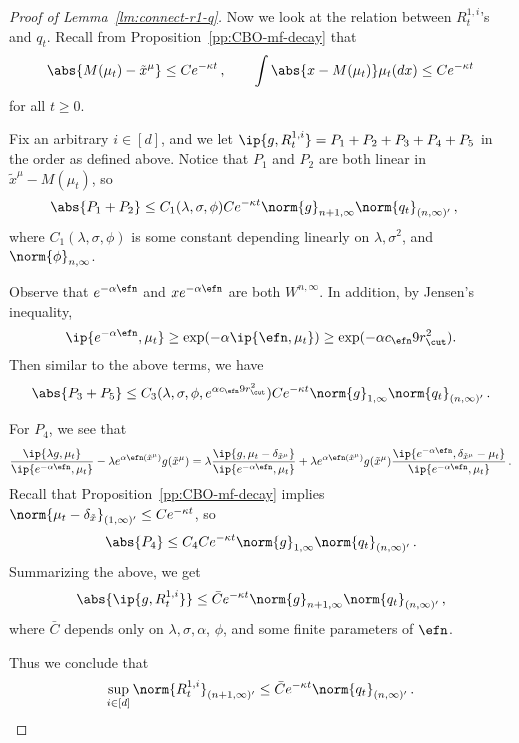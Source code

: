 \documentclass{amsart}
\begin{document}
\begin{proof}[Proof of Lemma~\ref{lm:connect-r1-q}]
	Now we look at the relation between $R^{1,i}_t$'s and $q_t$. 
	Recall from Proposition~\ref{pp:CBO-mf-decay} that 
	\begin{equation}
		\label{e:m-mu-t-decay}
		\abs{M(\mu_t) - \tilde x^\mu} \le C e^{-\kappa t} \,, \qquad \int \abs{x - M(\mu_t)} \mu_t(dx) \le C e^{-\kappa t} 
	\end{equation}
	for all $t \ge 0$.

	Fix an arbitrary $i \in [d]$, and we let $\ip{g, R^{1,i}_t} = P_1 + P_2 + P_3 + P_4 + P_5$ in the order as defined above. 
	Notice that $P_1$ and $P_2$ are both linear in $\tilde x^\mu - M(\mu_t)$, so 
	\begin{align*}
		\abs{P_1 + P_2} & \le C_1(\lambda,\sigma,\phi) C e^{-\kappa t} \norm{g}_{n+1,\infty} \norm{q_t}_{(n,\infty)'} \,,
	\end{align*}
	where $C_1(\lambda,\sigma,\phi)$ is some constant depending linearly on $\lambda, \sigma^2$, and $\norm{\phi}_{n,\infty}$.

	Observe that $e^{-\alpha \efn}$ and $x e^{-\alpha \efn}$ are both $W^{n,\infty}$.
    In addition, by Jensen's inequality, 
    \begin{equation*}
        \ip{e^{-\alpha \efn}, \mu_t} \ge \exp(-\alpha \ip{\efn, \mu_t}) \ge \exp(-\alpha c_\efn 9 r_\cut^2). 
    \end{equation*}
	Then similar to the above terms, we have
	\begin{equation*}
		\abs{P_3 + P_5} \le C_3(\lambda, \sigma, \phi, e^{\alpha c_\efn 9 r_\cut^2}) C e^{-\kappa t} \norm{g}_{1,\infty} \norm{q_t}_{(n,\infty)'} \,.
	\end{equation*}

	For $P_4$, we see that 
	\begin{equation*}
		\frac{\ip{\lambda g, \mu_t} }{\ip{e^{-\alpha\efn}, \mu_t}} - \lambda e^{\alpha \efn(\tilde x^\mu)} g(\tilde x^\mu) = \lambda \frac{\ip{g, \mu_t - \delta_{\tilde x^\mu}} }{\ip{e^{-\alpha\efn}, \mu_t}} +  \lambda e^{\alpha \efn(\tilde x^\mu)} g(\tilde x^\mu)  \frac{ \ip{e^{-\alpha\efn}, \delta_{\tilde x^\mu} - \mu_t} }{\ip{e^{-\alpha\efn},\mu_t}} \,.
	\end{equation*}
	Recall that Proposition~\ref{pp:CBO-mf-decay} implies $\norm{\mu_t - \delta_{\tilde x}}_{(1,\infty)'} \le C e^{-\kappa t}$, so 
	\begin{equation*}
		\abs{P_4} \le C_4 C e^{-\kappa t} \norm{g}_{1,\infty} \norm{q_t}_{(n,\infty)'} \,.
	\end{equation*}
	Summarizing the above, we get 
	\begin{equation*}
		\abs{\ip{g, R^{1,i}_t}} \le \bar C e^{-\kappa t} \norm{g}_{n+1,\infty} \norm{q_t}_{(n,\infty)'} \,,
	\end{equation*}
	where $\bar C$ depends only on $\lambda, \sigma, \alpha$, $\phi$, and some finite parameters of $\efn$. 
	
	Thus we conclude that 
	\begin{equation*}
		\sup_{i \in [d]} \norm{R^{1,i}_t}_{(n+1,\infty)'} \le \bar C e^{-\kappa t} \norm{q_t}_{(n,\infty)'} \,.
	\end{equation*}
\end{proof}
\end{document}
